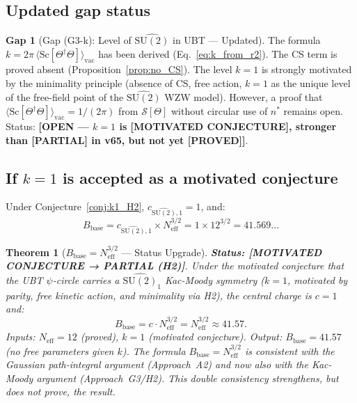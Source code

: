 \documentclass[11pt,a4paper]{article}
\newtheorem{theorem}{Theorem}
\theoremstyle{definition}
\newtheorem{gap}{Gap}
\theoremstyle{remark}
\begin{document}
\subsection{Updated gap status}

\begin{gap}[Gap (G3-k): Level of $\widehat{\mathrm{SU}(2)}$ in UBT — Updated]
  \label{gap:G3_k_updated}
  The formula $k = 2\pi\,\langle\mathrm{Sc}[\Theta^\dagger\Theta]\rangle_\mathrm{vac}$
  has been derived (Eq.~\ref{eq:k_from_r2}).
  The CS term is proved absent (Proposition~\ref{prop:no_CS}).
  The level $k = 1$ is strongly motivated by the minimality principle
  (absence of CS, free action, $k=1$ as the unique level of the free-field
  point of the $\widehat{\mathrm{SU}(2)}$ WZW model).
  However, a proof that $\langle\mathrm{Sc}[\Theta^\dagger\Theta]\rangle_\mathrm{vac}
  = 1/(2\pi)$ from $\mathcal{S}[\Theta]$ without circular use of $n^*$
  remains open.
  Status: \textbf{[OPEN — $k=1$ is [MOTIVATED CONJECTURE],
  stronger than [PARTIAL] in v65, but not yet [PROVED]]}.
\end{gap}

\subsection{If $k=1$ is accepted as a motivated conjecture}

Under Conjecture~\ref{conj:k1_H2}, $c_{\widehat{\mathrm{SU}(2)},1} = 1$, and:
\begin{equation}
  B_{\mathrm{base}}
  = c_{\widehat{\mathrm{SU}(2)},1} \times N_{\mathrm{eff}}^{3/2}
  = 1 \times 12^{3/2}
  = 41.569\ldots
  \label{eq:B_base_final}
\end{equation}

\begin{theorem}[$B_{\mathrm{base}} = N_{\mathrm{eff}}^{3/2}$ — Status Upgrade]
  \label{thm:B_base}
  \textbf{Status: [MOTIVATED CONJECTURE → PARTIAL (H2)]}.
  Under the motivated conjecture that the UBT $\psi$-circle carries
  a $\widehat{\mathrm{SU}(2)}_1$ Kac-Moody symmetry ($k=1$, motivated by
  parity, free kinetic action, and minimality via H2), the central charge
  is $c = 1$ and:
  \[
    B_{\mathrm{base}}
    = c \cdot N_{\mathrm{eff}}^{3/2}
    = N_{\mathrm{eff}}^{3/2}
    \approx 41.57.
  \]
  Inputs: $N_{\mathrm{eff}} = 12$ (proved), $k=1$ (motivated conjecture).
  Output: $B_{\mathrm{base}} = 41.57$ (no free parameters given $k$).
  The formula $B_{\mathrm{base}} = N_{\mathrm{eff}}^{3/2}$ is consistent with
  the Gaussian path-integral argument (Approach~A2) and now also with
  the Kac-Moody argument (Approach~G3/H2).
  This double consistency strengthens, but does not prove, the result.
\end{theorem}
\end{document}
